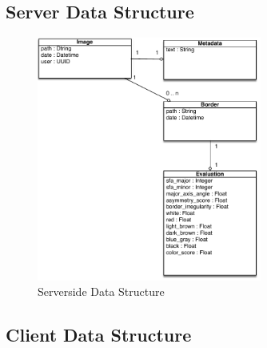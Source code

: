 \subsection{Server Data Structure}


\begin{figure}[H]
    \centering
    \includegraphics[height=8cm,keepaspectratio]{assets/data/server_data.pdf}
    \caption{Serverside Data Structure}
    \label{fig:data_server}
\end{figure}


\subsection{Client Data Structure}
